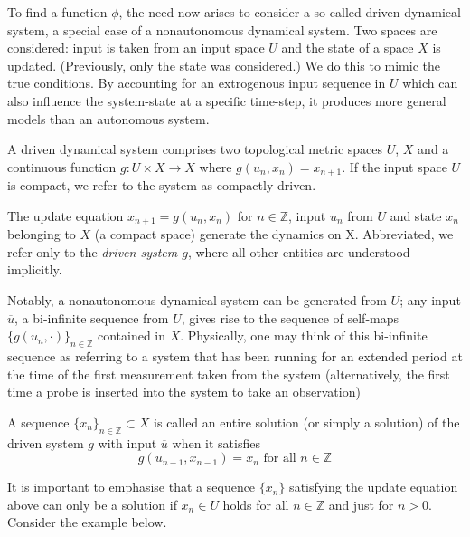 To find a function $\phi$, the need now arises to consider a so-called driven dynamical system, a special case of a nonautonomous dynamical system. Two spaces are considered: input is taken from an input space $U$ and the state of a space $X$ is updated. (Previously, only the state was considered.)
We do this to mimic the true conditions. By accounting for an extrogenous input sequence in $U$ which can also influence the  system-state at a specific time-step, it produces more general models than an autonomous system.

\begin{Definition}
  \label{Dfn_DDS} \rm
A driven dynamical system comprises two topological metric spaces $U$, $X$ and a continuous function  $g:U\times{X}\to{X}$ where $g(u_n, x_n)=x_{n+1}$.
If the input space $U$ is compact, we refer to the system as compactly driven. 
\end{Definition}

The update equation $x_{n+1} = g(u_n,x_n)$ for $n \in\mathbb{Z}$, input $u_n$ from $U$ and state $x_n$ belonging to $X$ (a compact space) generate the dynamics on X. 
Abbreviated, we refer only to the \textit{driven system $g$}, where all other entities are understood implicitly.

Notably, a nonautonomous dynamical system can be generated from $U$; any input $\overline{u}$, a bi-infinite sequence from $U$, gives rise to the sequence of self-maps ${\{g(u_n, \cdot)\}}_{n\in\mathbb{Z}}$ contained in $X$.
Physically, one may think of this bi-infinite sequence as referring to a system that has been running for an extended period at the time of the first measurement taken from the system (alternatively, the first time a probe is inserted into the system to take an observation)

\begin{Definition}
  \label{Dfn_Soln} \rm
  A sequence ${\{x_n\}}_{n\in\mathbb{Z}}\subset X$ is called an entire solution (or simply a solution) of the driven system  $g$ with input $\overline{u}$ when it satisfies 
  \begin{equation}
    g(u_{n-1}, x_{n-1})=x_n \text{ for all }n\in\mathbb{Z}
  \end{equation}
  
\end{Definition}

It is important to emphasise that a sequence $\{x_n\}$ satisfying the update equation above can only be a solution if $x_n\in{U}$ holds for all $n\in\mathbb{Z}$ and just for $n>0$. Consider the example below.

